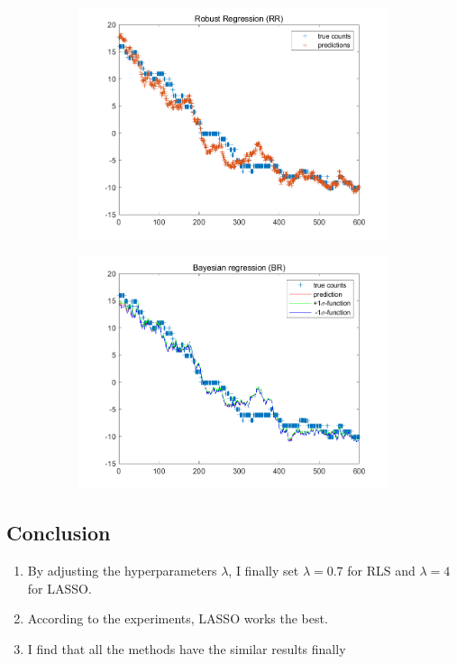 \documentclass{article}
\begin{document}
\begin{figure}[H]
\begin{subfigure}[b]{0.475\textwidth}
        \includegraphics[width=\textwidth]{fig/2a-rr.png} 
    \end{subfigure}
    \quad
    \begin{subfigure}[b]{0.475\textwidth}   
        \centering 
        \includegraphics[width=\textwidth]{fig/2a-br.png} 
    \end{subfigure}
\end{figure}

\subsection*{Conclusion}
\begin{enumerate}[label=(\roman*)]
    \item By adjusting the hyperparameters $\lambda$, I finally set $\lambda = 0.7$ for RLS and $\lambda = 4$ for LASSO.
    \item According to the experiments, LASSO works the best.
    \item I find that all the methods have the similar results finally
\end{enumerate}
\end{document}

